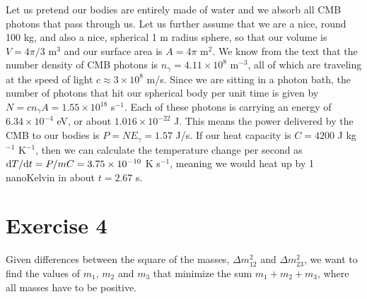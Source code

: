 \documentclass[12pt,a4paper]{article}
\newcommand\TM[1]{\todo[color=green!40, inline, size=\small]{TM: #1}}
\begin{document}
Let us pretend our bodies are entirely made of water and we absorb all CMB photons that pass through us. Let us further assume that we are a nice, round 100 kg, and also a nice, spherical 1 m radius sphere, so that our volume is $V=4\pi/3$ m$^{3}$ and our surface area is $A=4\pi$ m$^{2}$. We know from the text that the number density of CMB photons is $n_\gamma = 4.11\times 10^{8}$ m$^{-3}$, all of which are traveling at the speed of light $c\approx 3\times 10^8$ m/s. Since we are sitting in a photon bath, the number of photons that hit our spherical body per unit time is given by $N = cn_\gamma A = 1.55\times 10^{18}$ s$^{-1}$. Each of these photons is carrying an energy of $6.34\times10^{-4}$ eV, or about $1.016\times10^{-22}$ J. This means the power delivered by the CMB to our bodies is $P = NE_\gamma = 1.57$ J/s. If our heat capacity is $C = 4200$ J kg$^{-1}$ K$^{-1}$, then we can calculate the temperature change per second as ${\rm d}T/{\rm d}t = P/mC = 3.75\times 10^{-10}$ K s$^{-1}$, meaning we would heat up by 1 nanoKelvin in about $t= 2.67$ s.

\section{Exercise 4}
\label{sec:c1ex4}

Given differences between the square of the masses, $\Delta m^2_{12}$ and $\Delta m^2_{23}$, we want to find the values of $m_1$, $m_2$ and $m_3$ that minimize the sum $m_1+m_2+m_3$, where all masses have to be positive. \TM{Finish this.}
\end{document}
